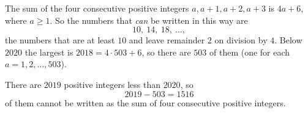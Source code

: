 The sum of the four consecutive positive integers $a,a+1,a+2,a+3$ is $4a+6$, where $a\ge1$. So the numbers that \emph{can} be written in this way are
\[10,\ 14,\ 18,\ \dots,\]
the numbers that are at least $10$ and leave remainder $2$ on division by $4$. Below $2020$ the largest is $2018=4\cdot503+6$, so there are $503$ of them (one for each $a=1,2,\dots,503$).

There are $2019$ positive integers less than $2020$, so
\[2019-503=\boxed{1516}\]
of them cannot be written as the sum of four consecutive positive integers.
